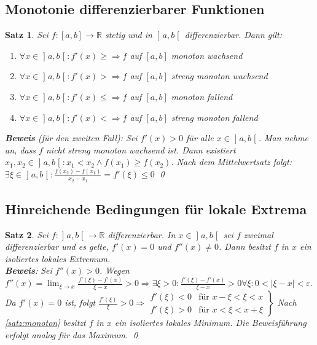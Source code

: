 \documentclass[ngerman,titlepage,twoside, parskip=half*]{scrreprt}
\newcommand*{\R}{\mathbb{R}}
\theoremstyle{plain}
\newtheorem{theorem}{Satz}[section]
\theoremstyle{definition}
\theoremstyle{remark}
\newcommand*{\abs}[2][]{#1\lvert#2#1\rvert}
\newcommand*{\bsofint}[1]{\mathopen{]}#1\mathclose{[}} %
\begin{document}
\subsection{Monotonie differenzierbarer Funktionen}
\begin{theorem}
  \label{satz:monoton}
  Sei $f\colon[a,b]\rightarrow\R$ stetig und in $\bsofint{a,b}$ differenzierbar. Dann
  gilt:
  \begin{enumerate}
    \item $\forall x \in \bsofint{a,b}\colon f'(x)\geq \Rightarrow f$ auf $[a,b]$
      monoton wachsend
    \item $\forall x \in \bsofint{a,b}\colon f'(x)> \Rightarrow f$ auf $[a,b]$ 
      streng monoton wachsend
    \item $\forall x \in \bsofint{a,b}\colon f'(x)\leq \Rightarrow f$ auf $[a,b]$
      monoton fallend
    \item $\forall x \in \bsofint{a,b}\colon f'(x)< \Rightarrow f$ auf $[a,b]$
      streng monoton fallend
  \end{enumerate}
  \textbf{Beweis} (für den zweiten Fall): Sei $f'(x)>0$ für alle $x\in
  \bsofint{a,b}$. Man nehme an, dass $f$ nicht streng monoton wachsend ist. Dann
  existiert $x_1,x_2\in\bsofint{a,b}\colon x_1<x_2\wedge f(x_1)\geq f(x_2)$. Nach dem
  Mittelwertsatz folgt: $\exists \xi\in\bsofint{a,b}\colon\frac{f(x_2)-f(x_1)}{x_2-x_1}
  =f'(\xi)\leq 0$\textnormal{\lightning}
  \qed
\end{theorem}

\subsection{Hinreichende Bedingungen für lokale Extrema}
\begin{theorem}
  \label{satz:lokExtrema}
  Sei $f\colon\bsofint{a,b}\rightarrow\R$ differenzierbar. In $x \in \bsofint{a,b}$ sei $f$
  zweimal differenzierbar und es gelte, $f'(x)=0$ und $f''(x)\neq 0$.
  Dann besitzt $f$ in $x$ ein isoliertes lokales Extremum.\\
  \textbf{Beweis}: Sei $f''(x)>0$. Wegen $f''(x)=\lim_{\xi\rightarrow x}
  \frac{f'(\xi)-f'(x)}{\xi-x}>0\Rightarrow\exists\xi>0\colon
  \frac{f'(\xi)-f'(x)}{\xi-x}>0 \forall\xi\colon0<\abs{\xi-x}<\varepsilon$.
  Da $f'(x)=0$ ist, folgt $\frac{f'(\xi)}{\xi}>0\Rightarrow
  \left.
  \begin{array}{rcl}
    f'(\xi)<0 & \text{für } x-\xi<\xi<x\\
    f'(\xi)>0 & \text{für } x<\xi<x+\xi
  \end{array}\right\}$ Nach \autoref{satz:monoton} besitzt $f$ in $x$
  ein isoliertes lokales Minimum. Die Beweisführung erfolgt analog für
  das Maximum.
  \qed
\end{theorem}
\end{document}
